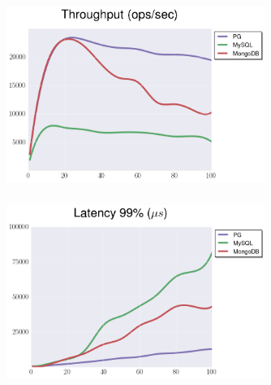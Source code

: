 \documentclass[usenames,dvipsnames, 18pt, compress, aspectratio=169]{beamer}
\begin{document}
\begin{frame}
    \frametitle{}
    \begin{center}
    \begin{figure}
        \includegraphics[width=0.75\textwidth,center]{benchmarks/select_btree_throughput.png}
    \end{figure}
    \end{center}
\end{frame}

\begin{frame}
    \frametitle{}
    \begin{center}
    \begin{figure}
        \includegraphics[width=0.75\textwidth,center]{benchmarks/select_btree_latency.png}
    \end{figure}
    \end{center}
\end{frame}
\end{document}
